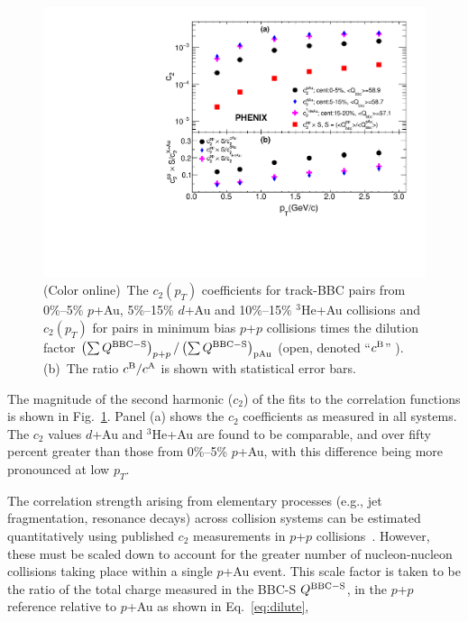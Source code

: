 \documentclass[%
reprint,
showpacs,preprintnumbers,
 amsmath,amssymb,
 aps,
]{revtex4-1}
\newcommand{\pt}{\mbox{$p_T$}\xspace}
\newcommand{\dau}{\mbox{$d$+Au}\xspace}
\newcommand{\pau}{\mbox{$p$+Au}\xspace}
\newcommand{\hau}{\mbox{$^3\text{He}$+Au}\xspace}
\newcommand{\pp}{\mbox{$p$+$p$}\xspace}
\begin{document}
\begin{figure}[htbp]
  \includegraphics[scale=0.45]{Figures/figure2.pdf}
  \caption{(Color online)~The $c_2(p_T)$ coefficients for track-BBC pairs from 
0\%--5\% \pau, 5\%--15\% \dau and 10\%--15\% \hau collisions and
$c_{2}(p_{T})$ for pairs in minimum bias \pp collisions times the dilution
factor $\left( \sum Q^{{\rm BBC-S}} \right)_{p+p} / \left( \sum Q^{{\rm
BBC-S}} \right)_{{\rm pAu}}$ (open, denoted ``$c^{{\rm B}}$'' ). (b)~The
ratio $c^{{\rm B}}/c^{{\rm A}}$ is shown with statistical error bars.
}
\label{fig:figure2}
\end{figure}

The magnitude of the second harmonic ($c_{2}$) of the fits to the correlation functions is shown in Fig.~\ref{fig:figure2}. Panel (a) shows the $c_{2}$ coefficients as measured in all systems. The $c_2$ values \dau and \hau are found to be comparable, and over fifty percent greater than those from 0\%--5\% \pau, with this difference being more pronounced at low \pt.

The correlation strength arising from elementary processes (e.g., jet fragmentation, resonance decays) across collision systems can be estimated quantitatively using published $c_{2}$ measurements in \pp collisions~\cite{PhysRevLett.115.142301}. However, these must be scaled down to account for the greater number of nucleon-nucleon collisions taking place within a single \pau event. This scale factor is taken to be the ratio of the total charge measured in the BBC-S $Q^{{\rm BBC-S}}$, in the \pp reference relative to \pau as shown in Eq.~\ref{eq:dilute},
\end{document}
